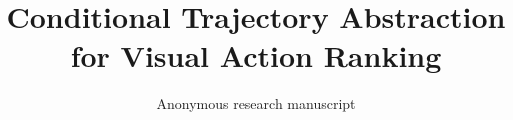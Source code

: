 \documentclass[10pt,twocolumn,letterpaper]{article}
\title{Conditional Trajectory Abstraction\\for Visual Action Ranking}
\author{Anonymous research manuscript}
\begin{document}
\maketitle









{
    \small
    
    
}
\end{document}
